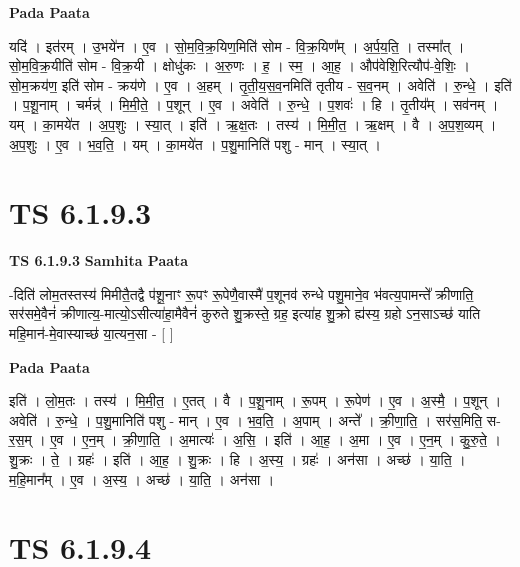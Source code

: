 \documentclass[17pt]{extarticle}
\begin{document}
\textbf{Pada Paata} \newline

यदि॑ । इत॑रम् । उ॒भये॑न । ए॒व । सो॒म॒वि॒क्र॒यिण॒मिति॑ सोम - वि॒क्र॒यिण᳚म् । अ॒र्प॒य॒ति॒ । तस्मा᳚त् । सो॒म॒वि॒क्र॒यीति॑ सोम - वि॒क्र॒यी । क्षोधु॑कः । अ॒रु॒णः । ह॒ । स्म॒ । आ॒ह॒ । औप॑वेशि॒रित्यौप॑-वे॒शिः॒ । सो॒म॒क्रय॑ण॒ इति॑ सोम - क्रय॑णे । ए॒व । अ॒हम् । तृ॒ती॒य॒स॒व॒नमिति॑ तृतीय - स॒व॒नम् । अवेति॑ । रु॒न्धे॒ । इति॑ । प॒शू॒नाम् । चर्मन्न्॑ । मि॒मी॒ते॒ । प॒शून् । ए॒व । अवेति॑ । रु॒न्धे॒ । प॒शवः॑ । हि । तृ॒तीय᳚म् । सव॑नम् । यम् । का॒मये॑त । अ॒प॒शुः । स्या॒त् । इति॑ । ऋ॒क्ष॒तः । तस्य॑ । मि॒मी॒त॒ । ऋ॒क्षम् । वै । अ॒प॒श॒व्यम् । अ॒प॒शुः । ए॒व । भ॒व॒ति॒ । यम् । का॒मये॑त । प॒शु॒मानिति॑ पशु - मान् । स्या॒त् ।  \newline





\section{ TS 6.1.9.3 }

\textbf{TS 6.1.9.3 } \newline
\textbf{Samhita Paata} \newline

-दिति॑ लोम॒तस्तस्य॑ मिमीतै॒तद्वै प॑शू॒नाꣳ रू॒पꣳ रू॒पेणै॒वास्मै॑ प॒शूनव॑ रुन्धे पशु॒माने॒व भ॑वत्य॒पामन्ते᳚ क्रीणाति॒ सर॑समे॒वैनं॑ क्रीणात्य॒-मात्यो॒ऽसीत्या॑हा॒मैवैनं॑ कुरुते शु॒क्रस्ते॒ ग्रह॒ इत्या॑ह शु॒क्रो ह्य॑स्य॒ ग्रहो ऽन॒साऽच्छ॑ याति महि॒मान॑-मे॒वास्याच्छ॑ या॒त्यन॒सा - [  ] \newline

\textbf{Pada Paata} \newline

इति॑ । लो॒म॒तः । तस्य॑ । मि॒मी॒त॒ । ए॒तत् । वै । प॒शू॒नाम् । रू॒पम् । रू॒पेण॑ । ए॒व । अ॒स्मै॒ । प॒शून् । अवेति॑ । रु॒न्धे॒ । प॒शु॒मानिति॑ पशु - मान् । ए॒व । भ॒व॒ति॒ । अ॒पाम् । अन्ते᳚ । क्री॒णा॒ति॒ । सर॑स॒मिति॒ स-र॒स॒म् । ए॒व । ए॒न॒म् । क्री॒णा॒ति॒ । अ॒मात्यः॑ । अ॒सि॒ । इति॑ । आ॒ह॒ । अ॒मा । ए॒व । ए॒न॒म् । कु॒रु॒ते॒ । शु॒क्रः । ते॒ । ग्रहः॑ । इति॑ । आ॒ह॒ । शु॒क्रः । हि । अ॒स्य॒ । ग्रहः॑ । अन॑सा । अच्छ॑ । या॒ति॒ । म॒हि॒मान᳚म् । ए॒व । अ॒स्य॒ । अच्छ॑ । या॒ति॒ । अन॑सा ।  \newline





\section{ TS 6.1.9.4 }
\end{document}
